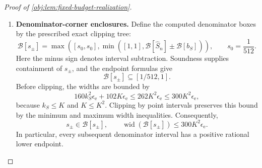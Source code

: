 \begin{proof}[Proof of \cref{obj:lem:fixed-budget-realization}]
\begin{enumerate}
For either retained rank \(k\), the elementary inequality
\(\log u\le u-1\) for \(u>0\) gives
\[
\log k=\log(k/2)+\log2
\le(k/2-1)+1=k/2.
\]
Applying the same inequality at \(u=1/2\) gives \(\log2\ge1/2\).
Thus, for every exponent \(\tau\) in the corresponding raw power-exponent box,
\[
\tau\log k
\le2\epsilon_{\mathrm e}\log k
\le k\epsilon_{\mathrm e}
\le\frac1{16}\le\log2.
\]
It follows that
\[
k^\tau\le2,
\qquad
\left|\frac{d}{d\tau}k^\tau\right|
=k^\tau\log k\le k.
\]
These inequalities include \(k=1\), for which the derivative is zero.
The mean-value bound and the primitive endpoint errors now imply
\[
\operatorname{wid}\bigl(\mathcal B[k^\tau]\bigr)
\le k\operatorname{wid}(\mathcal B_{\mathrm{pow}})
    +2\epsilon_{\mathrm e}
\le(2k+2)\epsilon_{\mathrm e},
\]
with \(\mathcal B_{\mathrm{pow}}\) the corresponding bias-exponent box.

The variance quantity
\[
V_n(k)=\frac{10}{n}+\frac{4k}{n(n-1)}
\]
is an exactly evaluated positive rational number. Its square-root enclosure therefore satisfies
\[
\operatorname{wid}\bigl(\mathcal B[\sqrt{20V_n(k)}]\bigr)
\le2\epsilon_{\mathrm e}.
\]
Using the constants in the radius expressions, we obtain successful enclosures containing \(b_C,b_S\), with
\[
\begin{aligned}
\operatorname{wid}(\mathcal B[b_C])
&\le\bigl(8(2k_C+2)+2\bigr)\epsilon_{\mathrm e}
=(16k_C+18)\epsilon_{\mathrm e}
\le34K\epsilon_{\mathrm e},\\
\operatorname{wid}(\mathcal B[b_S])
&\le\bigl(25(2k_S+2)+2\bigr)\epsilon_{\mathrm e}
=(50k_S+52)\epsilon_{\mathrm e}
\le102K\epsilon_{\mathrm e}.
\end{aligned}
\]
The last inequalities use \(k_C,k_S\le K\) and \(K\ge1\).

\item \textbf{Denominator-corner enclosures.}
Define the computed denominator boxes by the prescribed exact clipping tree:
\[
\mathcal B[s_\pm]
=
\max\left(
[s_0,s_0],
\min\left([1,1],
\mathcal B[\widehat S_n]\pm\mathcal B[b_S]\right)
\right),
\qquad s_0=\frac1{512}.
\]
Here the minus sign denotes interval subtraction. Soundness supplies containment of \(s_\pm\), and the endpoint formulas give
\[
\mathcal B[s_\pm]\subseteq[1/512,1].
\]
Before clipping, the widths are bounded by
\[
160k_S^2\epsilon_{\mathrm e}+102K\epsilon_{\mathrm e}
\le262K^2\epsilon_{\mathrm e}
\le300K^2\epsilon_{\mathrm e},
\]
because \(k_S\le K\) and \(K\le K^2\). Clipping by point intervals preserves this bound by the minimum and maximum width inequalities. Consequently,
\[
s_\pm\in\mathcal B[s_\pm],
\qquad
\operatorname{wid}(\mathcal B[s_\pm])
\le300K^2\epsilon_{\mathrm e}.
\]
In particular, every subsequent denominator interval has a positive rational lower endpoint.


\end{enumerate}
\end{proof}
